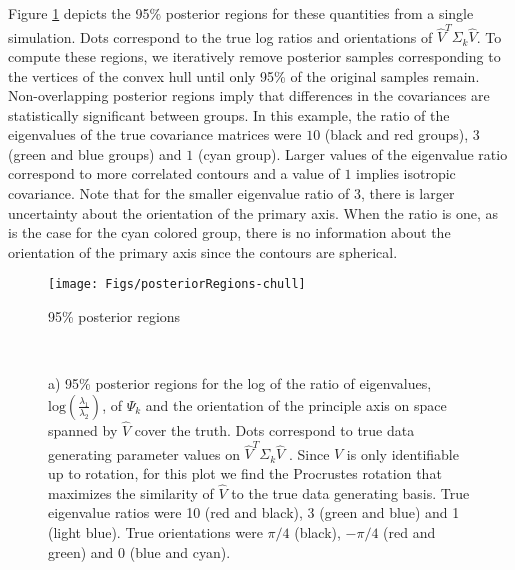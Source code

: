\documentclass[12pt]{article}
\begin{document}
Figure \ref{fig:simPosterior} depicts the 95\% posterior regions for
these quantities from a single simulation.  Dots correspond to the
true log ratios and orientations of $\hat{V}^T\Sigma_k\hat{V}$. To compute
these regions, we iteratively remove posterior samples corresponding to the
vertices of the convex hull until only 95\% of the original samples
remain.  Non-overlapping posterior regions imply that differences in
the covariances are statistically significant between groups.  In this
example, the ratio of the eigenvalues of the true covariance matrices
were $10$ (black and red groups), $3$ (green and blue groups) and $1$
(cyan group).  Larger values of the eigenvalue ratio correspond to more
correlated contours and a value of $1$ implies isotropic covariance.
Note that for the smaller eigenvalue ratio of $3$, there is larger
uncertainty about the orientation of the primary axis.  When the ratio
is one, as is the case for the cyan colored group, there is no
information about the orientation of the primary axis since the contours
are spherical.

\begin{figure}[t]
    \centering
    \texttt{[image: Figs/posteriorRegions-chull]}
        \caption{95\% posterior regions}
        \label{fig:simPosterior}
    ~ %
    \caption{a) 95\% posterior regions for the log of the ratio of
      eigenvalues, $\text{log}(\frac{\lambda_1}{\lambda_2})$, of $\Psi_k$ and the
      orientation of the principle axis on space spanned by $\hat{V}$
      cover the truth.  Dots correspond to true data generating
      parameter values on $\hat{V}^T\Sigma_k\hat{V}$ .  Since $V$
      is only identifiable up to rotation, for this plot we find the Procrustes
      rotation that maximizes the similarity of $\hat{V}$ to the true
      data generating basis. True eigenvalue ratios were 10 (red and
      black), 3 (green and blue) and 1 (light blue).  True
      orientations were $\pi/4$ (black), $-\pi/4$ (red and green) and
      0 (blue and cyan). %
    }
\end{figure}
\end{document}
